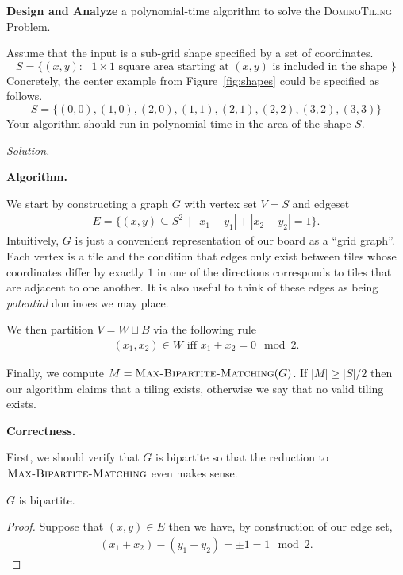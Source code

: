 \documentclass[11pt]{article}
\begin{document}
\textbf{Design and Analyze} a polynomial-time algorithm to solve the \textsc{DominoTiling} Problem.

Assume that the input is a sub-grid shape specified by a set of coordinates.
$$S = \{ (x,y) : \textrm{ $1 \times 1$ square area starting at $(x,y)$ is included in the shape } \}$$
Concretely, the center example from Figure~\ref{fig:shapes} could be specified as follows.
$$S = \{(0,0), (1,0), (2,0), (1,1), (2,1), (2,2), (3,2), (3,3)\}$$
Your algorithm should run in polynomial time in the area of the shape $S$.

{\color{blue}
\emph{Solution.}

\textbf{Algorithm.} 

We start by constructing a graph $G$ with vertex set $V = S$ and edgeset 
\begin{align*}
 E = \{ (x, y) \subseteq S^2 \, \mid \, |x_1 - y_1| + |x_2 - y_2| = 1 \}.
\end{align*}
Intuitively, $G$ is just a convenient representation of our board as a ``grid graph''. Each vertex is a tile and the condition that edges only exist between tiles whose coordinates differ by exactly $1$ in one of the directions corresponds to tiles that are adjacent to one another. It is also useful to think of these edges as being \emph{potential} dominoes we may place.

We then partition $V = W \sqcup B$ via the following rule 
\begin{align*}
  (x_1, x_2) \in W \text{ iff } x_1 + x_2 = 0 \mod 2.
\end{align*}

Finally, we compute $M = \textsc{Max-Bipartite-Matching}(G)$. If $|M| \ge |S|/2$ then our algorithm claims that a tiling exists, otherwise we say that no valid tiling exists. 

\textbf{Correctness.}

First, we should verify that $G$ is bipartite so that the reduction to $\textsc{Max-Bipartite-Matching}$ even makes sense. 

\setcounter{section}{3}
\begin{lemma}
$G$ is bipartite.
\end{lemma}
\begin{proof}
  Suppose that $(x, y) \in E$ then we have, by construction of our edge set,
\begin{align*}
  (x_1 + x_2) - (y_1 + y_2) = \pm 1 = 1 \mod 2. 
\end{align*}


\end{proof}}
\end{document}
